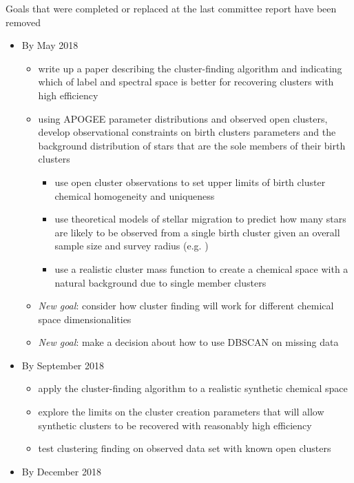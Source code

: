\documentclass[11pt]{article}
\begin{document}
Goals that were completed or replaced at the last committee report have been removed

\begin{itemize}

\item By May 2018
\begin{itemize}
\item {\color{ForestGreen} write up a paper describing the cluster-finding algorithm and indicating which of label and spectral space is better for recovering clusters with high efficiency}
\item {\color{RoyalBlue}using APOGEE parameter distributions and observed open clusters, develop observational constraints on birth clusters parameters and the background distribution of stars that are the sole members of their birth clusters}
\begin{itemize}
\item {\color{RoyalBlue} use open cluster observations to set upper limits of birth cluster chemical homogeneity and uniqueness}
\item use theoretical models of stellar migration to predict how many stars are likely to be observed from a single birth cluster given an overall sample size and survey radius (e.g. \citealt{Ting2015})
\item {\color{RoyalBlue} use a realistic cluster mass function to create a chemical space with a natural background due to single member clusters}
\end{itemize}
\item \emph{New goal}: {\color{RoyalBlue} consider how cluster finding will work for different chemical space dimensionalities}
\item \emph{New goal}: {\color{RoyalBlue} make a decision about how to use DBSCAN on missing data}
\end{itemize}
\item By September 2018
\begin{itemize}
\item {\color{RoyalBlue}apply the cluster-finding algorithm to a realistic synthetic chemical space} 
\item {\color{RoyalBlue} explore the limits on the cluster creation parameters that will allow synthetic clusters to be recovered with reasonably high efficiency}
\item {\color{RoyalBlue} test clustering finding on observed data set with known open clusters}
\end{itemize}
\item By December 2018

\end{itemize}
\end{document}
